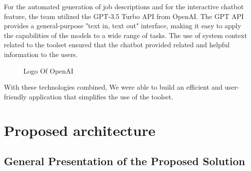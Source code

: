 For the automated generation of job descriptions and for the interactive chatbot feature, the team utilized the {\color{purple}GPT-3.5 Turbo API} from OpenAI. The GPT API provides a general-purpose "text in, text out" interface, making it easy to apply the capabilities of the models to a wide range of tasks. The use of system context related to the  toolset ensured that the chatbot provided related and helpful information to the users.

\begin{figure}[H]
    \centering
    \caption{  Logo Of OpenAI }
    \label{fig: OpenAI_Logo}
\end{figure}

With these technologies combined, We were able to build an efficient and user-friendly application that simplifies the use of the  toolset.


\section{Proposed architecture}
\subsection{General Presentation of the Proposed Solution}



